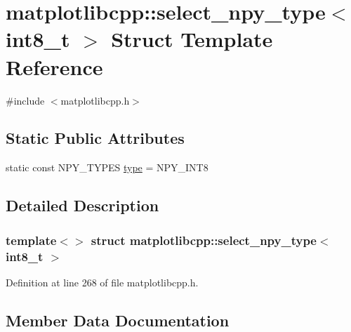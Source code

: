 \hypertarget{structmatplotlibcpp_1_1select__npy__type_3_01int8__t_01_4}{}\section{matplotlibcpp\+::select\+\_\+npy\+\_\+type$<$ int8\+\_\+t $>$ Struct Template Reference}
\label{structmatplotlibcpp_1_1select__npy__type_3_01int8__t_01_4}


{\ttfamily \#include $<$matplotlibcpp.\+h$>$}

\subsection*{Static Public Attributes}
\begin{DoxyCompactItemize}
\item 
static const N\+P\+Y\+\_\+\+T\+Y\+P\+ES \mbox{\hyperlink{structmatplotlibcpp_1_1select__npy__type_3_01int8__t_01_4_a74836a19458ed32ca8948a4337364eae}{type}} = N\+P\+Y\+\_\+\+I\+N\+T8
\end{DoxyCompactItemize}


\subsection{Detailed Description}
\subsubsection*{template$<$$>$\newline
struct matplotlibcpp\+::select\+\_\+npy\+\_\+type$<$ int8\+\_\+t $>$}



Definition at line 268 of file matplotlibcpp.\+h.



\subsection{Member Data Documentation}
\mbox{\label{structmatplotlibcpp_1_1select__npy__type_3_01int8__t_01_4_a74836a19458ed32ca8948a4337364eae}} 
